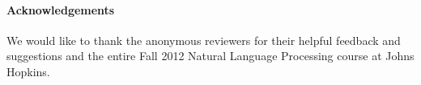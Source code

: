 \documentclass[11pt,letterpaper]{article}
\begin{document}

\paragraph*{Acknowledgements}
We would like to thank the anonymous reviewers for their helpful feedback and suggestions 
and the entire Fall 2012 Natural Language Processing course at 
Johns Hopkins.




\end{document}
